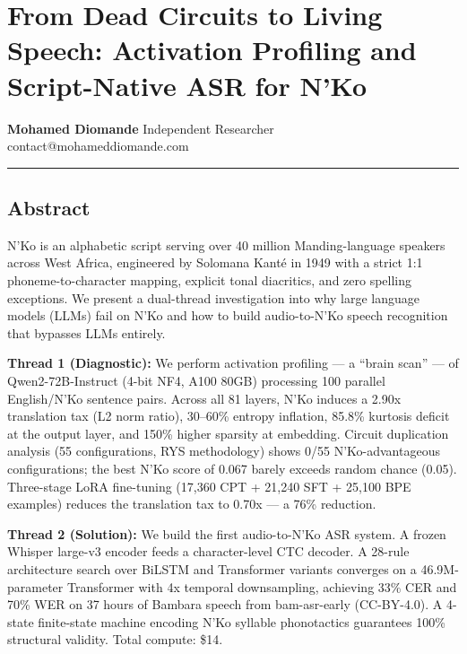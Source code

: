 \documentclass[
]{article}
\author{}
\date{}
\begin{document}
\section{From Dead Circuits to Living Speech: Activation Profiling and
Script-Native ASR for
N'Ko}\label{from-dead-circuits-to-living-speech-activation-profiling-and-script-native-asr-for-nko}

\textbf{Mohamed Diomande} Independent Researcher
contact@mohameddiomande.com

\begin{center}\rule{0.5\linewidth}{0.5pt}\end{center}

\subsection{Abstract}\label{abstract}

N'Ko is an alphabetic script serving over 40 million Manding-language
speakers across West Africa, engineered by Solomana Kanté in 1949 with a
strict 1:1 phoneme-to-character mapping, explicit tonal diacritics, and
zero spelling exceptions. We present a dual-thread investigation into
why large language models (LLMs) fail on N'Ko and how to build
audio-to-N'Ko speech recognition that bypasses LLMs entirely.

\textbf{Thread 1 (Diagnostic):} We perform activation profiling --- a
``brain scan'' --- of Qwen2-72B-Instruct (4-bit NF4, A100 80GB)
processing 100 parallel English/N'Ko sentence pairs. Across all 81
layers, N'Ko induces a 2.90x translation tax (L2 norm ratio), 30--60\%
entropy inflation, 85.8\% kurtosis deficit at the output layer, and
150\% higher sparsity at embedding. Circuit duplication analysis (55
configurations, RYS methodology) shows 0/55 N'Ko-advantageous
configurations; the best N'Ko score of 0.067 barely exceeds random
chance (0.05). Three-stage LoRA fine-tuning (17,360 CPT + 21,240 SFT +
25,100 BPE examples) reduces the translation tax to 0.70x --- a 76\%
reduction.

\textbf{Thread 2 (Solution):} We build the first audio-to-N'Ko ASR
system. A frozen Whisper large-v3 encoder feeds a character-level CTC
decoder. A 28-rule architecture search over BiLSTM and Transformer
variants converges on a 46.9M-parameter Transformer with 4x temporal
downsampling, achieving 33\% CER and 70\% WER on 37 hours of Bambara
speech from bam-asr-early (CC-BY-4.0). A 4-state finite-state machine
encoding N'Ko syllable phonotactics guarantees 100\% structural
validity. Total compute: \$14.
\end{document}
